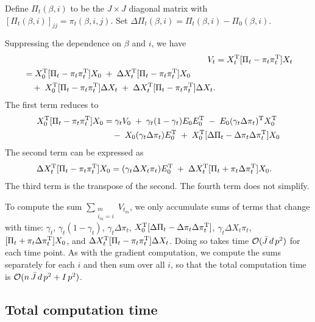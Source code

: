 \documentclass[final]{statsoc}
\begin{document}
Define $\Pi_t(\beta, i)$ to be the $J \times J$ diagonal matrix with
$[\Pi_t(\beta, i)]_{jj} = \pi_t(\beta, i, j)$.  Set
$\Delta \Pi_t(\beta, i) = \Pi_t(\beta, i) - \Pi_0(\beta, i)$.

Suppressing the dependence on $\beta$ and $i$, we have
\begin{align*}
  V_t
    &= X_t^{\mathrm{T}} [\Pi_t - \pi_t \pi_t^{\mathrm{T}}] X_t \\
\begin{split}
    &= X_0^{\mathrm{T}} [\Pi_t - \pi_t \pi_t^{\mathrm{T}}] X_0
      \;+\; \Delta X_t^{\mathrm{T}} [\Pi_t - \pi_t \pi_t^{\mathrm{T}}] X_0 \\
      &\quad+\; X_0^{\mathrm{T}} [\Pi_t - \pi_t \pi_t^{\mathrm{T}}] \Delta X_t
      \;+\; \Delta X_t^{\mathrm{T}} [\Pi_t - \pi_t \pi_t^{\mathrm{T}}] \Delta X_t.
\end{split}
\end{align*}
The first term reduces to
\begin{align*}
  X_0^{\mathrm{T}} [ \Pi_t - \pi_t \pi_t^{\mathrm{T}}] X_0 
    &= \gamma_t V_0 
    \;+\; \gamma_t (1 - \gamma_t) E_0 E_0^{\mathrm{T}}
    \;-\; E_0 (\gamma_t \Delta \pi_t)^{\mathrm{T}} X_0^{\mathrm{T}}  \\
    &\quad-\; X_0 (\gamma_t \Delta \pi_t) E_0^{\mathrm{T}} 
    \;+\; X_0^{\mathrm{T}} [ \Delta \Pi_t - \Delta \pi_t \Delta \pi_t^{\mathrm{T}} ] X_0
\end{align*}
The second term can be expressed as
\begin{align*}
  \Delta X_t^{\mathrm{T}} [ \Pi_t - \pi_t \pi_t^{\mathrm{T}}] X_0
    &= (\gamma_t \Delta X_t \pi_t) E_0^{\mathrm{T}}
    \;+\; \Delta X_t^{\mathrm{T}} [\Pi_t + \pi_t \Delta \pi_t^{\mathrm{T}}] X_0.
\end{align*}
The third term is the transpose of the second.  The fourth term does not
simplify.

To compute the sum $\sum_{\substack{m \\ i_m = i}} V_{t_m}$, we only
accumulate sums of terms that change with time:
$\gamma_t$,
$\gamma_t(1 - \gamma_t)$,
$\gamma_t \Delta \pi_t$,
$X_0^{\mathrm{T}}[\Delta \Pi_t - \Delta \pi_t \Delta \pi_t^{\mathrm{T}}]$,
$\gamma_t \Delta X_t \pi_t$, 
$[\Pi_t + \pi_t \Delta \pi_t^{\mathrm{T}}] X_0$,
and
$\Delta X_t^{\mathrm{T}} [\Pi_t - \pi_t \pi_t^{\mathrm{T}}] \Delta X_t$.
Doing so takes time $\mathcal{O}(\bar J \, d \, p^2)$ for each time point.  As with
the gradient computation, we compute the sums separately for each $i$ and then
sum over all $i$, so that the total computation time is
$\mathcal{O}(n \, \bar J \, d \, p^2 + I \, p^2)$.

\subsection{Total computation time}
\end{document}
